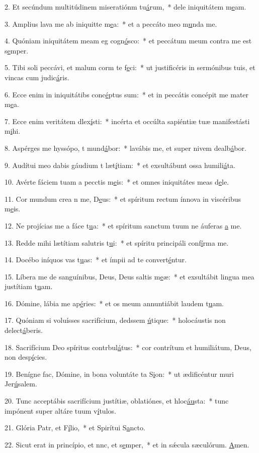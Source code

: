 2. Et secúndum multitúdinem miseratiónm tu\uline{á}rum,~* dele iniquitátem m\uline{e}am.\par 
3. Amplius lava me ab iniquitte m\uline{e}a:~* et a peccáto meo m\uline{u}nda me.\par 
4. Quóniam iniquitátem meam eg cogn\uline{ó}sco:~* et peccátum meum contra me est s\uline{e}mper.\par 
5. Tibi soli peccávi, et malum corm te f\uline{e}ci:~* ut justificéris in sermónibus tuis, et vincas cum judic\uline{á}ris.\par 
6. Ecce enim in iniquitátibs conc\uline{é}ptus sum:~* et in peccátis concépit me mater m\uline{e}a.\par 
7. Ecce enim veritátem dlex\uline{í}sti:~* incérta et occúlta sapiéntiæ tuæ manifestásti m\uline{i}hi.\par 
8. Aspérges me hyssópo, t mund\uline{á}bor:~* lavábis me, et super nivem dealb\uline{á}bor.\par 
9. Audítui meo dabis gáudium t læt\uline{í}tiam:~* et exsultábunt ossa humili\uline{á}ta.\par 
10. Avérte fáciem tuam a pecctis m\uline{e}is:~* et omnes iniquitátes meas d\uline{e}le.\par 
11. Cor mundum crea n me, D\uline{e}us:~* et spíritum rectum ínnova in viscéribus m\uline{e}is.\par 
12. Ne projícias me a fáce t\uline{u}a:~* et spíritum sanctum tuum ne áuferas \uline{a} me.\par 
13. Redde mihi lætítiam salutris t\uline{u}i:~* et spíritu principáli conf\uline{í}rma me.\par 
14. Docébo iníquos vas t\uline{u}as:~* et ímpii ad te convert\uline{é}ntur.\par 
15. Líbera me de sanguínibus, Deus, Deus saltis m\uline{e}æ:~* et exsultábit lingua mea justítiam t\uline{u}am.\par 
16. Dómine, lábia me ap\uline{é}ries:~* et os meum annuntiábit laudem t\uline{u}am.\par 
17. Quóniam si voluísses sacrifícium, dedssem \uline{ú}tique:~* holocáustis non delect\uline{á}beris.\par 
18. Sacrifícium Deo spíritus contrbul\uline{á}tus:~* cor contrítum et humiliátum, Deus, non desp\uline{í}cies.\par 
19. Benígne fac, Dómine, in bona voluntáte ta S\uline{i}on:~* ut ædificéntur muri Jer\uline{ú}salem.\par 
20. Tunc acceptábis sacrifícium justítiæ, oblatiónes, et hloc\uline{áu}sta:~* tunc impónent super altáre tuum v\uline{í}tulos.\par 
21. Glória Patr, et F\uline{í}lio,~* et Spirítui S\uline{a}ncto.\par 
22. Sicut erat in princípio, et nnc, et s\uline{e}mper,~* et in sǽcula sæculórum. \uline{A}men.\par 
